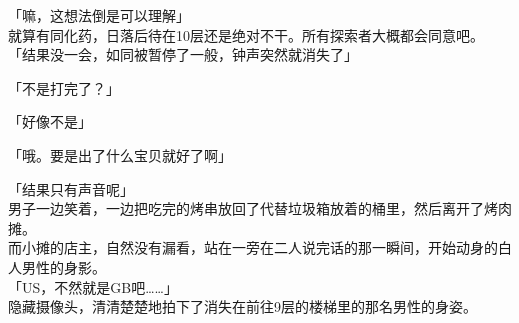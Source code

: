 「嘛，这想法倒是可以理解」\\

就算有同化药，日落后待在10层还是绝对不干。所有探索者大概都会同意吧。\\

「结果没一会，如同被暂停了一般，钟声突然就消失了」

「不是打完了？」

「好像不是」

「哦。要是出了什么宝贝就好了啊」

「结果只有声音呢」\\

男子一边笑着，一边把吃完的烤串放回了代替垃圾箱放着的桶里，然后离开了烤肉摊。\\

而小摊的店主，自然没有漏看，站在一旁在二人说完话的那一瞬间，开始动身的白人男性的身影。\\

「US，不然就是GB吧……」\\

隐藏摄像头，清清楚楚地拍下了消失在前往9层的楼梯里的那名男性的身姿。\\
